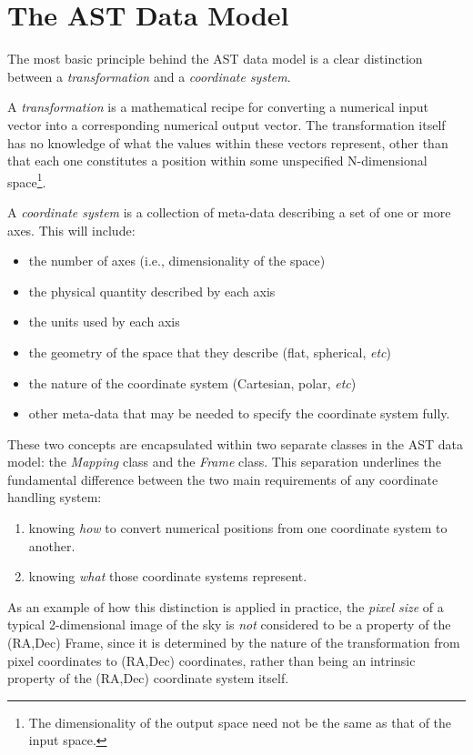 \documentclass[final,authoryear,5p,times,twocolumn]{elsarticle}
\begin{document}
\section{The AST Data Model}
\label{sec:model}

The most basic principle behind the AST data model is a clear distinction
between a \emph{transformation} and a \emph{coordinate system}.

A \emph{transformation} is a mathematical recipe for converting a numerical
input vector into a corresponding numerical output vector. The
transformation itself has no knowledge of what the values within these
vectors represent, other than that each one constitutes a position within
some unspecified N-dimensional space\footnote{The dimensionality of the
output space need not be the same as that of the input space.}.

A \emph{coordinate system} is a collection of meta-data describing a set of
one or more axes. This will include:
\begin{itemize}
\item the number of axes (i.e., dimensionality of the space)
\item the physical quantity described by each axis
\item the units used by each axis
\item the geometry of the space that they describe (flat, spherical,
\emph{etc})
\item the nature of the coordinate system (Cartesian, polar, \emph{etc})
\item other meta-data that may be needed to specify the coordinate system
fully.
\end{itemize}

These two concepts are encapsulated within two separate classes in the
AST data model: the \emph{Mapping} class and the \emph{Frame} class. This
separation underlines the fundamental difference between the two main
requirements of any coordinate handling system:

\begin{enumerate}
\item knowing \emph{how} to convert numerical positions from one coordinate
system to another.
\item knowing \emph{what} those coordinate systems represent.
\end{enumerate}

As an example of how this distinction is applied in practice, the
\emph{pixel size} of a typical 2-dimensional image of the sky is
\emph{not} considered to be a property of the (RA,Dec) Frame, since it is
determined by the nature of the transformation from pixel coordinates to
(RA,Dec) coordinates, rather than being an intrinsic property of the (RA,Dec)
coordinate system itself.
\end{document}
